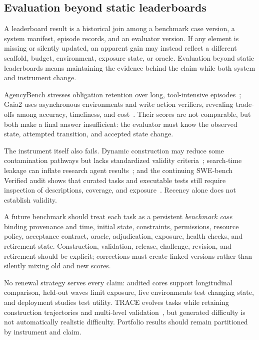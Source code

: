 \subsection{Evaluation beyond static leaderboards}

A leaderboard result is a historical join among a benchmark case version, a system manifest, episode records, and an evaluator version. If any element is missing or silently updated, an apparent gain may instead reflect a different scaffold, budget, environment, exposure state, or oracle. Evaluation beyond static leaderboards means maintaining the evidence behind the claim while both system and instrument change.

AgencyBench stresses obligation retention over long, tool-intensive episodes~\cite{li2026agencybench}; Gaia2 uses asynchronous environments and write action verifiers, revealing trade-offs among accuracy, timeliness, and cost~\cite{froger2026gaia2}. Their scores are not comparable, but both make a final answer insufficient: the evaluator must know the observed state, attempted transition, and accepted state change.

The instrument itself also fails. Dynamic construction may reduce some contamination pathways but lacks standardized validity criteria~\cite{chen2025contamination}; search-time leakage can inflate research agent results~\cite{wang2026searchtime}; and the continuing SWE-bench Verified audit shows that curated tasks and executable tests still require inspection of descriptions, coverage, and exposure~\cite{jimenez2024swebench,openai2026swebenchaudit}. Recency alone does not establish validity.

A future benchmark should treat each task as a persistent \emph{benchmark case} binding provenance and time, initial state, constraints, permissions, resource policy, acceptance contract, oracle, adjudication, exposure, health checks, and retirement state. Construction, validation, release, challenge, revision, and retirement should be explicit; corrections must create linked versions rather than silently mixing old and new scores.

No renewal strategy serves every claim: audited cores support longitudinal comparison, held-out waves limit exposure, live environments test changing state, and deployment studies test utility. TRACE evolves tasks while retaining construction trajectories and multi-level validation~\cite{guo2026selfevolving}, but generated difficulty is not automatically realistic difficulty. Portfolio results should remain partitioned by instrument and claim.

